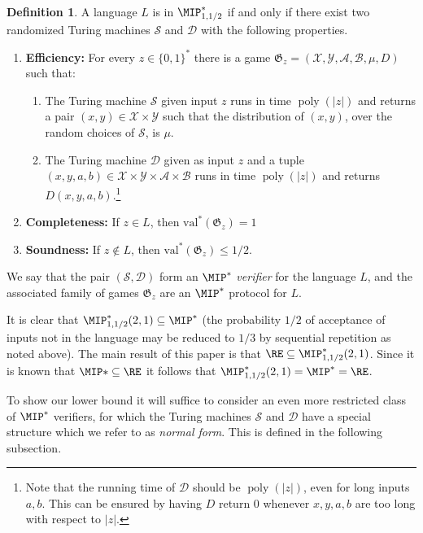 \documentclass[11pt]{article}
\theoremstyle{definition}
\newtheorem{definition}[theorem]{Definition}
\DeclareMathOperator{\poly}{poly}
\newcommand{\val}{\ensuremath{\mathrm{val}}}
\newcommand{\game}{\mathfrak{G}}
\newcommand{\sampler}{\mathcal{S}}
\newcommand{\decider}{\mathcal{D}}
\renewcommand{\cal}[1]{\mathcal{#1}}
\begin{document}
\begin{definition}\label{def:mipstar}
  A language $L$ is in $\MIP^*_{1,1/2}$ if and only if there exist two randomized Turing machines
  $\sampler$ and $\decider$ with the following properties.
  \begin{enumerate}
    \item \textbf{Efficiency:} For every $z\in\{0,1\}^*$ there is
      a game $\game_z = (\cal{X}, \cal{Y}, \cal{A}, \cal{B}, \mu, D)$
      such that:
      \begin{enumerate}
      \item The Turing machine $\sampler$ given input $z$ runs in time $\poly(|z|)$ and returns a
      pair $(x,y) \in \cal{X} \times \cal{Y}$ such that the distribution of $(x,y)$, over the random choices of $\sampler$, is $\mu$.
    \item The Turing machine $\decider$ given as input $z$ and a tuple $(x,y,a,b)
      \in \cal{X} \times \cal{Y} \times \cal{A} \times \cal{B}$ runs in time $\poly(|z|)$ and returns $D(x,y,a,b)$.\footnote{Note that the running time of $\decider$ should be $\poly(|z|)$, even for long inputs $a,b$. This can be ensured by having $D$ return $0$ whenever $x,y,a,b$ are too long with respect to $|z|$.}
    \end{enumerate}
  \item \textbf{Completeness:} If $z \in L$, then $\val^*(\game_z) = 1$
  \item \textbf{Soundness:} If $z \not\in L$, then $\val^*(\game_z) \leq 1/2$.
  \end{enumerate}
  We say that the pair $(\sampler, \decider)$ form an $\MIP^*$
  \emph{verifier} for the language $L$, and the associated family of
  games $\game_z$ are an $\MIP^*$ protocol for $L$.
\end{definition}

  It is clear that $\MIP^*_{1,1/2}(2,1) \subseteq \MIP^*$ (the
  probability $1/2$ of acceptance of inputs not in the language may be
  reduced to $1/3$ by sequential repetition as noted above). The main result of this paper is that $\RE
  \subseteq \MIP^*_{1,1/2}(2,1)$. Since it is known that $\MIP*\subseteq \RE$ it follows
  that $\MIP^*_{1,1/2}(2,1) = \MIP^* = \RE$. 

 To show our lower bound it will suffice to consider an even more restricted class of $\MIP^*$
  verifiers, for which the Turing machines $\sampler$ and
  $\decider$ have a special structure which we refer to as
  \emph{normal form}. This is defined in the following subsection.
	
\end{document}
